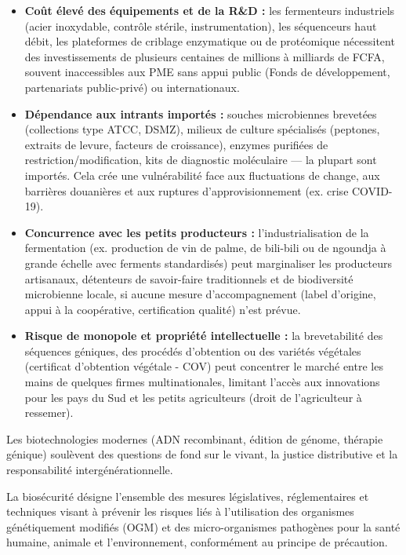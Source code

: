 \documentclass[11pt]{article}
\newcommand{\cle}[1]{{\popxbold\color{popdark}#1}}
\newcounter{popsec}
\newcounter{popsub}
\newcommand{\courssub}[1]{%
  \stepcounter{popsub}%
  \par\vspace{9pt}\noindent{\popxbold\fontsize{11.5}{13}\selectfont\color{popink}{\color{poporange}\thepopsec.\thepopsub}\hspace{6pt}#1}\par\nopagebreak\vspace{4pt}
}
\begin{document}
\begin{itemize}
    \item \textbf{Coût élevé des équipements et de la R\&D :} les fermenteurs industriels (acier inoxydable, contrôle stérile, instrumentation), les séquenceurs haut débit, les plateformes de criblage enzymatique ou de protéomique nécessitent des investissements de plusieurs centaines de millions à milliards de FCFA, souvent inaccessibles aux PME sans appui public (Fonds de développement, partenariats public-privé) ou internationaux.
    \item \textbf{Dépendance aux intrants importés :} souches microbiennes brevetées (collections type ATCC, DSMZ), milieux de culture spécialisés (peptones, extraits de levure, facteurs de croissance), enzymes purifiées de restriction/modification, kits de diagnostic moléculaire — la plupart sont importés. Cela crée une vulnérabilité face aux fluctuations de change, aux barrières douanières et aux ruptures d'approvisionnement (ex. crise COVID-19).
    \item \textbf{Concurrence avec les petits producteurs :} l'industrialisation de la fermentation (ex. production de vin de palme, de \cle{bili-bili} ou de \cle{ngoundja} à grande échelle avec ferments standardisés) peut marginaliser les producteurs artisanaux, détenteurs de savoir-faire traditionnels et de biodiversité microbienne locale, si aucune mesure d'accompagnement (label d'origine, appui à la coopérative, certification qualité) n'est prévue.
    \item \textbf{Risque de monopole et propriété intellectuelle :} la brevetabilité des séquences géniques, des procédés d'obtention ou des variétés végétales (certificat d'obtention végétale - COV) peut concentrer le marché entre les mains de quelques firmes multinationales, limitant l'accès aux innovations pour les pays du Sud et les petits agriculteurs (droit de l'agriculteur à ressemer).
\end{itemize}

\courssub{Enjeux éthiques et juridiques}

Les biotechnologies modernes (ADN recombinant, édition de génome, thérapie génique) soulèvent des questions de fond sur le vivant, la justice distributive et la responsabilité intergénérationnelle.

\begin{definition}[Biosécurité]
La \cle{biosécurité} désigne l'ensemble des mesures législatives, réglementaires et techniques visant à prévenir les risques liés à l'utilisation des organismes génétiquement modifiés (OGM) et des micro-organismes pathogènes pour la santé humaine, animale et l'environnement, conformément au principe de précaution.
\end{definition}
\end{document}
